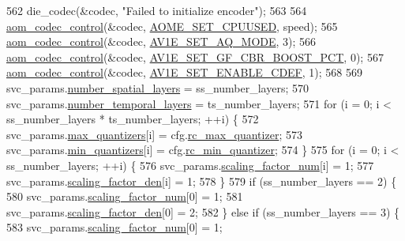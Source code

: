 \begin{DoxyCodeInclude}
{{{{{{{{{{{{{{{{{{562     die\_codec(&codec, \textcolor{stringliteral}{"Failed to initialize encoder"});
563 
564   \hyperlink{group__codec_ga6da974f4eeaba1fa74106b28d0fe6ac5}{aom\_codec\_control}(&codec, \hyperlink{group__aom__encoder_ggae78dde67a6d78f332e9bdba0dde42db5adac09e1a8da079b08fca5ccbf981f1a6}{AOME\_SET\_CPUUSED}, speed);
565   \hyperlink{group__codec_ga6da974f4eeaba1fa74106b28d0fe6ac5}{aom\_codec\_control}(&codec, \hyperlink{group__aom__encoder_ggae78dde67a6d78f332e9bdba0dde42db5a17bd297efc31082157785d68fc5a6067}{AV1E\_SET\_AQ\_MODE}, 3);
566   \hyperlink{group__codec_ga6da974f4eeaba1fa74106b28d0fe6ac5}{aom\_codec\_control}(&codec, \hyperlink{group__aom__encoder_ggae78dde67a6d78f332e9bdba0dde42db5ade327180f01d27d22abd94c1f0a8bc9e}{AV1E\_SET\_GF\_CBR\_BOOST\_PCT}, 0);
567   \hyperlink{group__codec_ga6da974f4eeaba1fa74106b28d0fe6ac5}{aom\_codec\_control}(&codec, \hyperlink{group__aom__encoder_ggae78dde67a6d78f332e9bdba0dde42db5a6879fe104e23de00f034ed11eb605031}{AV1E\_SET\_ENABLE\_CDEF}, 1);
568 
569   svc\_params.\hyperlink{structaom__svc__params_a3ac79ae856b34c3a8a44e1615ef452d5}{number\_spatial\_layers} = ss\_number\_layers;
570   svc\_params.\hyperlink{structaom__svc__params_adae9509ce69067d122d9a4bcae94b340}{number\_temporal\_layers} = ts\_number\_layers;
571   \textcolor{keywordflow}{for} (i = 0; i < ss\_number\_layers * ts\_number\_layers; ++i) \{
572     svc\_params.\hyperlink{structaom__svc__params_a3366999bf6b17fa3ad2b2a57092ddcee}{max\_quantizers}[i] = cfg.\hyperlink{structaom__codec__enc__cfg_a8f8851455e06db026022d4b01671b122}{rc\_max\_quantizer};
573     svc\_params.\hyperlink{structaom__svc__params_a558bc3a8d00cabe8f112c8977e927d0c}{min\_quantizers}[i] = cfg.\hyperlink{structaom__codec__enc__cfg_aa5c6cede8c820ef29fc3c106aa1227eb}{rc\_min\_quantizer};
574   \}
575   \textcolor{keywordflow}{for} (i = 0; i < ss\_number\_layers; ++i) \{
576     svc\_params.\hyperlink{structaom__svc__params_af29066b136efb3837dfc674d2bcc60f2}{scaling\_factor\_num}[i] = 1;
577     svc\_params.\hyperlink{structaom__svc__params_a89c964e4a3e25c4c76bb20242bee3f6b}{scaling\_factor\_den}[i] = 1;
578   \}
579   \textcolor{keywordflow}{if} (ss\_number\_layers == 2) \{
580     svc\_params.\hyperlink{structaom__svc__params_af29066b136efb3837dfc674d2bcc60f2}{scaling\_factor\_num}[0] = 1;
581     svc\_params.\hyperlink{structaom__svc__params_a89c964e4a3e25c4c76bb20242bee3f6b}{scaling\_factor\_den}[0] = 2;
582   \} \textcolor{keywordflow}{else} \textcolor{keywordflow}{if} (ss\_number\_layers == 3) \{
583     svc\_params.\hyperlink{structaom__svc__params_af29066b136efb3837dfc674d2bcc60f2}{scaling\_factor\_num}[0] = 1;
}}}}}}}}}}}}}}}}}}
\end{DoxyCodeInclude}
